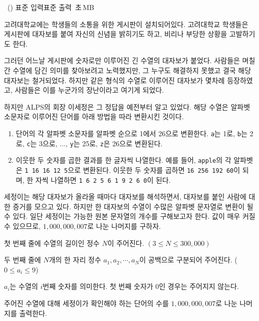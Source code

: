 \begin{problem}{\kcpcprobposter\ (\kcpcprobpostershort)}
    {표준 입력}{표준 출력}
    {\kcpcprobpostertime\,초}{\kcpcprobpostermemory\,MB}{}
    
    고려대학교에는 학생들의 소통을 위한 게시판이 설치되어있다. 고려대학교 학생들은 게시판에 대자보를 붙여 자신의 신념을 밝히기도 하고, 비리나 부당한 상황을 고발하기도 한다. 
    
    그러던 어느날 게시판에 숫자로만 이루어진 긴 수열의 대자보가 붙었다. 사람들은 며칠간 수열에 담긴 의미를 찾아보려고 노력했지만, 그 누구도 해결하지 못했고 결국 해당 대자보는 철거되었다. 하지만 같은 형식의 수열로 이루어진 대자보가 몇차례 등장하였고, 사람들은 이를 누군가의 장난이라고 여기게 되었다.
    
    하지만 ALPS의 회장 이세정은 그 정답을 예전부터 알고 있었다. 해당 수열은 알파벳 소문자로 이루어진 단어를 아래 방법을 따라 변환시킨 것이다.
    
    \begin{enumerate}
        \item 단어의 각 알파벳 소문자를 알파벳 순으로 1에서 26으로 변환한다. \texttt{a}는 1로, \texttt{b}는 2로, \texttt{c}는 3으로, ..., \texttt{y}는 25로, \texttt{z}은 26으로 변환된다.
        \item 이웃한 두 숫자를 곱한 결과를 한 글자씩 나열한다. 예를 들어, \texttt{apple}의 각 알파벳은 \texttt{1 16 16 12 5}으로 변환된다. 이웃한 두 숫자를 곱하면 \texttt{16 256 192 60}이 되며, 한 자씩 나열하면 \texttt{1 6 2 5 6 1 9 2 6 0}이 된다.
    \end{enumerate}
    
   
    
    세정이는 해당 대자보가 올라올 때마다 대자보를 해석하면서, 대자보를 붙인 사람에 대한 증거를 모으고 있다. 하지만 한 대자보의 수열이 수많은 알파벳 문자열로 변환이 될 수 있다. 일단 세정이는 가능한 원본 문자열의 개수를 구해보고자 한다. 값이 매우 커질 수 있으므로, $ 1,000,000,007 $로 나눈 나머지를 구하자.
    
    \InputFile
    첫 번째 줄에 수열의 길이인 정수 $N$이 주어진다. $ (3 \leq N \leq 300,000)$
    
    두 번째 줄에 $N$개의 한 자리 정수 $a_1, a_2, \cdots, a_N$이 공백으로 구분되어 주어진다. ($0 \leq a_i \leq 9$)
    
    $a_i$는 수열의 $i$번째 숫자를 의미한다. 첫 번째 숫자가 0인 경우는 주어지지 않는다.
    
    \OutputFile
    주어진 수열에 대해 세정이가 확인해야 하는 단어의 수를 $ 1,000,000,007 $로 나눈 나머지를 출력한다.
    
    \Examples
    \begin{example}
    \end{example}
\end{problem}

